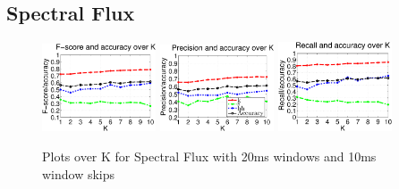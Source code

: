 	
	\subsection{Spectral Flux}
		
		\begin{figure}
		
		
			\centering\includegraphics[width=0.3\textwidth]{tex/appendices/test/sflux2010FP.png}
			\centering\includegraphics[width=0.3\textwidth]{tex/appendices/test/sflux2010_P.png}
			\centering\includegraphics[width=0.3\textwidth]{tex/appendices/test/sflux2010_R.png}
			
			\caption{Plots over K for Spectral Flux with 20ms windows and 10ms window skips}
		\end{figure}
